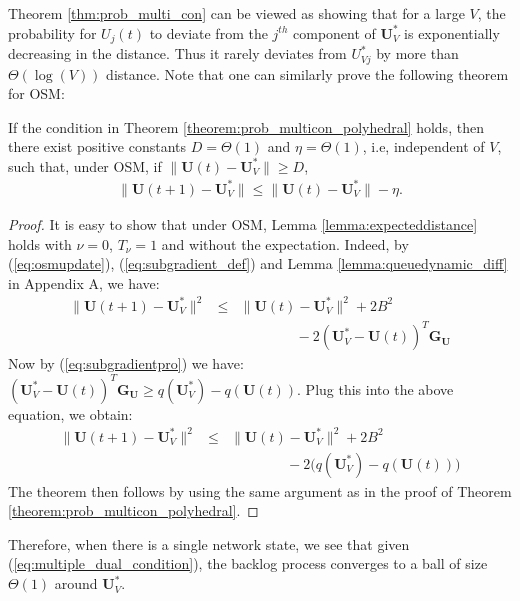 \documentclass[journal]{IEEEtran}
\newcommand{\bv}[1]{{\boldsymbol{#1} }}
\begin{document}
Theorem \ref{thm:prob_multi_con} can be viewed as showing that for a large $V$, the probability for $U_j(t)$ to deviate from the $j^{th}$ component of $\bv{U}^*_{V}$ is exponentially decreasing in the distance. Thus it rarely deviates from $U^*_{Vj}$ by more than $\Theta(\log(V))$ distance. Note that one can similarly prove the following theorem for OSM:
\begin{thm}\label{coro:drift_multiple_norm}
If  the condition in Theorem \ref{theorem:prob_multicon_polyhedral} holds, then there exist positive constants $D=\Theta(1)$ and $\eta=\Theta(1)$, i.e, independent of $V$,  such that, under OSM, if $ \|\bv{U}(t)-\bv{U}^*_V\|\geq D$, 
\begin{eqnarray}
\|\bv{U}(t+1)-\bv{U}_V^*\|\leq\|\bv{U}(t)-\bv{U}_V^*\|-\eta.\label{eq:drift_multiple_norm}
\end{eqnarray}
\end{thm}
\begin{proof}
It is easy to show that under OSM, Lemma \ref{lemma:expecteddistance} holds with $\nu=0$, $T_{\nu}=1$ and without the expectation. Indeed, by (\ref{eq:osmupdate}),  (\ref{eq:subgradient_def}) and Lemma \ref{lemma:queuedynamic_diff} in Appendix A, we have: 
\begin{eqnarray*}
\|\bv{U}(t+1)-\bv{U}^*_V\|^2&\leq& \|\bv{U}(t)-\bv{U}^*_V\|^2 + 2B^2\nonumber\\
&& \qquad\qquad-2 (\bv{U}^*_V-\bv{U}(t))^T\bv{G}_{\bv{U}}%
\end{eqnarray*}
Now by (\ref{eq:subgradientpro}) we have: $(\bv{U}^*_V-\bv{U}(t))^T\bv{G}_{\bv{U}}\geq q(\bv{U}^*_V)-q(\bv{U}(t))$. Plug this into the above equation, we obtain:
\begin{eqnarray*}
\|\bv{U}(t+1)-\bv{U}^*_V\|^2&\leq& \|\bv{U}(t)-\bv{U}^*_V\|^2 + 2B^2\nonumber\\
&&\qquad\qquad-2\big(q(\bv{U}^*_V)-q(\bv{U}(t))\big)
\end{eqnarray*}
The theorem then follows by using the same argument as in the proof of Theorem \ref{theorem:prob_multicon_polyhedral}.
\end{proof}

Therefore, when there is a single network state, we see that given (\ref{eq:multiple_dual_condition}), the backlog process converges to a ball of size $\Theta(1)$ around $\bv{U}^*_V$.
\end{document}
